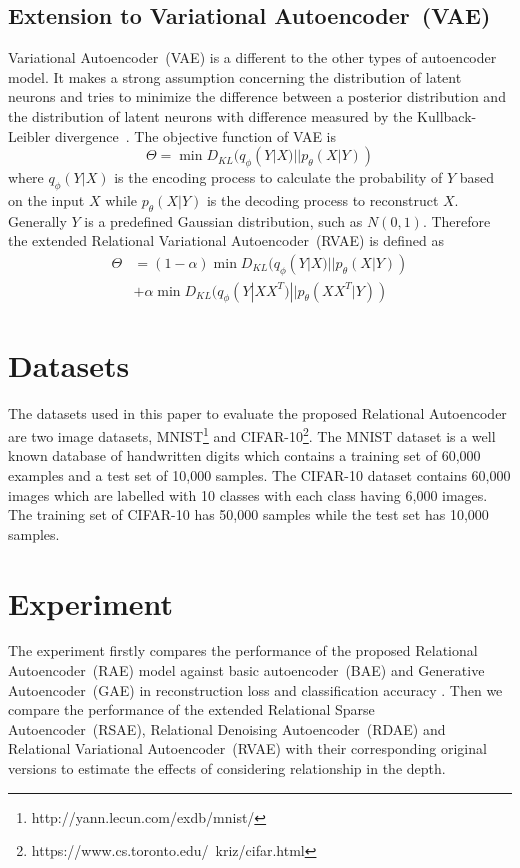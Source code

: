 \documentclass[conference]{IEEEtran}
\begin{document}
	\subsection{Extension to Variational Autoencoder~(VAE)}
	Variational Autoencoder~(VAE) is a different to the other types of autoencoder model. It makes a strong assumption concerning the distribution of latent neurons and tries to minimize the difference between a posterior distribution and the distribution of latent neurons with difference measured by the Kullback-Leibler divergence~\cite{kullback1951information}. The objective function of VAE is
	\begin{equation}
	\Theta = \min D_{KL}(q_{\phi}(Y|X)||p_{\theta}(X|Y))
	\end{equation}
	where $q_{\phi}(Y|X)$ is the encoding process to calculate the probability of $Y$ based on the input $X$ while $p_{\theta}(X|Y)$ is the decoding process to reconstruct $X$. Generally $Y$ is a predefined Gaussian distribution, such as $N(0,1)$. Therefore the extended Relational Variational Autoencoder~(RVAE) is defined as
	\begin{equation}
	\begin{split}
	\Theta &= (1-\alpha)\min D_{KL}(q_{\phi}(Y|X)||p_{\theta}(X|Y))\\
	& + \alpha\min D_{KL}(q_{\phi}(Y|XX^{T})||p_{\theta}(XX^{T}|Y))
	\end{split}
	\end{equation}
	
	\section{Datasets}  \label{sec5}
	The datasets used in this paper to evaluate the proposed Relational Autoencoder are two image datasets, MNIST\footnote{http://yann.lecun.com/exdb/mnist/} and CIFAR-10\footnote{https://www.cs.toronto.edu/~kriz/cifar.html}. The MNIST dataset is a well known database of handwritten digits which contains a training set of 60,000 examples and a test set of 10,000 samples. The CIFAR-10 dataset contains 60,000 images which are labelled with 10 classes with each class having 6,000 images. The training set of CIFAR-10 has 50,000 samples while the test set has 10,000 samples.
	
	\section{Experiment} \label{sec6}
	The experiment firstly compares the performance of the proposed Relational Autoencoder~(RAE) model against basic autoencoder~(BAE) and Generative Autoencoder~(GAE) in reconstruction loss and classification accuracy \cite{Wu:IJCNN1,Wu:TNNLS}. Then we compare the performance of the extended Relational Sparse Autoencoder~(RSAE), Relational Denoising Autoencoder~(RDAE) and Relational Variational Autoencoder~(RVAE) with their corresponding original versions to estimate the effects of considering relationship in the depth.
	
\end{document}
